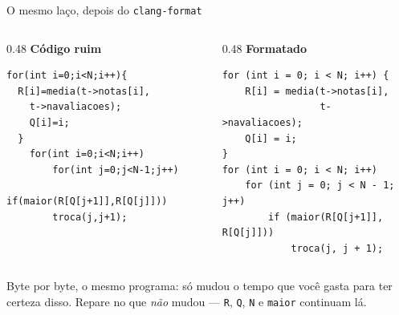 \documentclass[aspectratio=169]{beamer}
\begin{document}
\begin{frame}[fragile]{O mesmo laço, depois do \texttt{clang-format}}
  \begin{columns}[T]
    \begin{column}{0.48\textwidth}
      \textcolor{UFSRed}{\textbf{Código ruim}}
\begin{lstlisting}[style=tinyC]
  for(int i=0;i<N;i++){
  R[i]=media(t->notas[i],
    t->navaliacoes);
    Q[i]=i;
  }
	for(int i=0;i<N;i++)
		for(int j=0;j<N-1;j++)
			if(maior(R[Q[j+1]],R[Q[j]]))
        troca(j,j+1);
\end{lstlisting}
    \end{column}
    \begin{column}{0.48\textwidth}
      \textcolor{UFSBlue}{\textbf{Formatado}}
\begin{lstlisting}[style=tinyC]
for (int i = 0; i < N; i++) {
    R[i] = media(t->notas[i],
                 t->navaliacoes);
    Q[i] = i;
}
for (int i = 0; i < N; i++)
    for (int j = 0; j < N - 1; j++)
        if (maior(R[Q[j+1]], R[Q[j]]))
            troca(j, j + 1);
\end{lstlisting}
    \end{column}
  \end{columns}
  \begin{block}{}
    \small Byte por byte, o mesmo programa: só mudou o tempo que você gasta
    para ter certeza disso. Repare no que \emph{não} mudou --- \texttt{R},
    \texttt{Q}, \texttt{N} e \texttt{maior} continuam lá.
  \end{block}
\end{frame}
\end{document}
